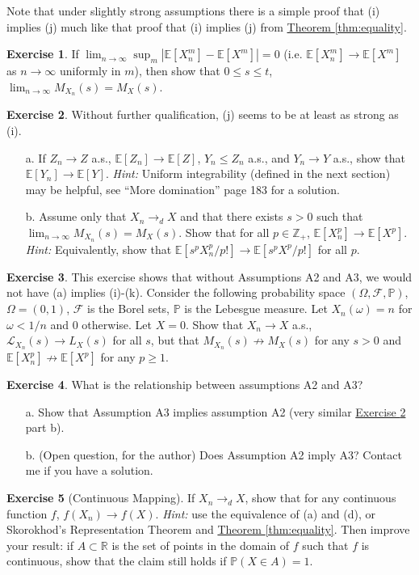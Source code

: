 \documentclass{article}
\theoremstyle{definition}
\newtheorem{exercise}{Exercise}
\renewcommand{\P}{\mathbb P}
\newcommand{\E}{\mathbb E}
\newcommand{\1}{\mathbb I}
\newcommand{\Z}{\mathbb Z}
\newcommand{\R}{\mathbb R}
\newcommand{\thmhref}[1]{\hyperref[#1]{Theorem \ref{#1}}}
\newcommand{\exerhref}[1]{\hyperref[#1]{Exercise \ref{#1}}}
\begin{document}
Note that under slightly strong assumptions there is a simple proof that (i) implies (j)
much like that proof that (i) implies (j) from \thmhref{thm:equality}.
\begin{exercise}
  If $\lim_{n \to \infty} \sup_m | \E[X_n^m] - \E[X^m]| = 0$
  (i.e. $\E[X_n^m] \to \E[X^m]$ as $n \to \infty$ uniformly in $m$),
  then show that $0 \leq s \leq t$, $\lim_{n \to \infty} M_{X_n}(s) = M_{X}(s)$.
\end{exercise}
\begin{exercise}
  \label{exer:moreDomination}
  Without further qualification, (j) seems to be at least as strong as (i).
  \begin{enumerate}
  \item [a.]If $Z_n \to Z$ a.s., $\E[Z_n] \to \E[Z]$, $Y_n \leq Z_n$ a.s., and $Y_n \to Y$ a.s., show that $\E[Y_n] \to \E[Y]$.  \emph{Hint:} Uniform integrability (defined in the next section) may be helpful, see \cite{resnick1998probability} ``More domination'' page 183 for a solution.
  \item [b.] Assume only that $X_n \to_d X$ and that there exists $s>0$
    such that $\lim_{n \to \infty} M_{X_n}(s) = M_{X}(s)$.  Show that
    for all $p \in \Z_+$, $\E[X_n^p] \to \E[X^p]$.  \emph{Hint:}
    Equivalently, show that $\E[s^pX_n^p/p!] \to \E[s^pX^p/p!]$ for all $p$.
  \end{enumerate}  
\end{exercise}
\begin{exercise}
  This exercise shows that without Assumptions A2 and A3, we would not have (a) implies (i)-(k).
  Consider the following probability space $(\Omega,\mathcal F, \P)$,
  $\Omega = (0,1)$, $\mathcal F$ is the Borel sets, $\P$ is the
  Lebesgue measure.  Let $X_n(\omega) = n$ for $\omega < 1/n$ and $0$
  otherwise.  Let $X = 0$.  Show that $X_n \to X$ a.s., $\mathcal
  L_{X_n}(s) \to L_{X}(s)$ for all $s$, but that $M_{X_n}(s) \not \to
  M_X(s)$ for any $s > 0$ and $\E[X_n^p] \not \to \E[X^p]$ for any $p
  \geq 1$.
\end{exercise}
\begin{exercise}
  What is the relationship between assumptions A2 and A3?
  \begin{enumerate}
  \item [a.] Show that Assumption A3 implies assumption A2 (very similar \exerhref{exer:moreDomination} part b).
  \item [b.] (Open question, for the author) Does Assumption A2 imply A3?
    Contact me if you have a solution.
  \end{enumerate}
\end{exercise}
\begin{exercise}[Continuous Mapping]
  \label{exer:continuousMapping}
  If $X_n \to_d X$, show that for any continuous function $f$, $f(X_n)
  \to f(X)$.  \emph{Hint:} use the equivalence of (a) and (d), or
  Skorokhod's Representation Theorem and \thmhref{thm:equality}.  Then
  improve your result: if $A \subset \R$ is the set of points in the
  domain of $f$ such that $f$ is continuous, show that the claim still
  holds if $\P(X \in A) = 1$.
\end{exercise}
\end{document}
